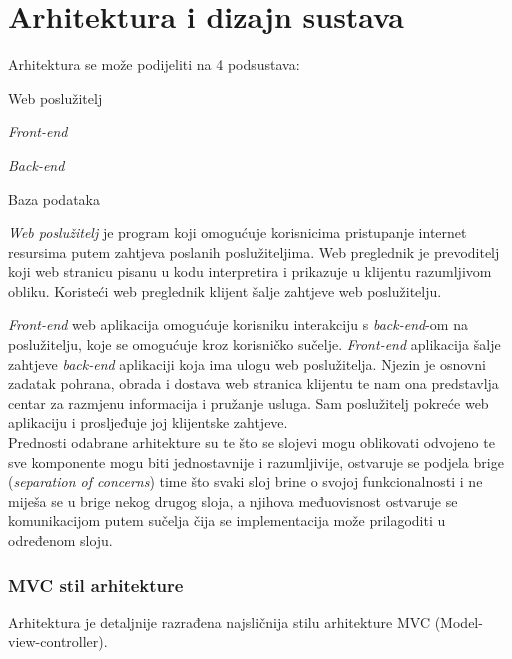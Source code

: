\chapter{Arhitektura i dizajn sustava}
		
		Arhitektura se može podijeliti na 4 podsustava:
		\begin{packed_item}
		
			\item   Web poslužitelj
			\item   \textit{Front-end}
			\item 	\textit{Back-end}
			\item   Baza podataka
		\end{packed_item}
		
		
		\textit{Web poslužitelj} je program koji omogućuje korisnicima pristupanje internet resursima putem zahtjeva poslanih poslužiteljima. Web preglednik je prevoditelj koji web stranicu
pisanu u kodu interpretira i prikazuje u klijentu razumljivom obliku. Koristeći web preglednik
klijent šalje zahtjeve web poslužitelju.
		
		\textit{Front-end} web aplikacija omogućuje korisniku interakciju s \textit{back-end}-om na poslužitelju, koje se omogućuje kroz korisničko sučelje. 
		\textit{Front-end} aplikacija šalje zahtjeve \textit{back-end} aplikaciji koja ima ulogu web poslužitelja. Njezin je osnovni zadatak pohrana, obrada i dostava web stranica klijentu te nam ona predstavlja
centar za razmjenu informacija i pružanje usluga. Sam poslužitelj pokreće web aplikaciju i
prosljeđuje joj klijentske zahtjeve.\\

		Prednosti odabrane arhitekture su te što se slojevi mogu oblikovati odvojeno te sve
komponente mogu biti jednostavnije i razumljivije, ostvaruje se podjela brige (\textit{separation of
concerns}) time što svaki sloj brine o svojoj funkcionalnosti i ne miješa se u brige nekog
drugog sloja, a njihova međuovisnost ostvaruje se komunikacijom putem sučelja čija se
implementacija može prilagoditi u određenom sloju.\\

		\pagebreak

		\subsection{MVC stil arhitekture}
		Arhitektura	je	detaljnije	razrađena	najsličnija	stilu	arhitekture	MVC	(Model-view-controller).\\
		

